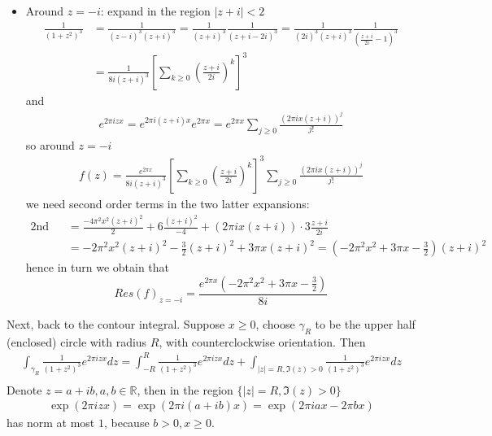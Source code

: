 \documentclass[11pt,a4paper]{article}
\begin{document}
\begin{itemize}
    \item Around $z=-i$: expand in the region $|z+i|<2$
    \begin{align*}
        \frac{1}{(1+z^2)^3} &= \frac{1}{(z-i)^3(z+i)^3} = \frac{1}{(z+i)^3}\frac{1}{(z+i-2i)^3} = \frac{1}{(2i)^3(z+i)^3}\frac{1}{(\frac{z+i}{2i}-1)^3} \\
        &=\frac{1}{8i(z+i)^3} \left[\sum_{k\ge0}  \left(\frac{z+i}{2i}\right)^k\right]^3
    \end{align*}
    and
    \begin{align*}
        e^{2\pi i zx} = e^{2\pi i (z+i)x} e^{2\pi x} = e^{2\pi x} \sum_{j\ge 0} \frac{(2\pi i x(z+i))^j}{j!}
    \end{align*}
    so around $z=-i$
    \begin{align*}
        f(z) = \frac{e^{2\pi x}}{8i(z+i)^3} \left[\sum_{k\ge0} \left(\frac{z+i}{2i}\right)^k\right]^3 \sum_{j\ge 0} \frac{(2\pi i x(z+i))^j}{j!}
    \end{align*}
    we need second order terms in the two latter expansions:
    \begin{align*}
        \text{2nd order terms} &= \frac{-4\pi^2x^2(z+i)^2}{2} + 6\frac{(z+i)^2}{-4} + (2\pi i x(z+i))\cdot 3\frac{z+i}{2i} \\
        &=-2\pi^2 x^2 (z+i)^2 - \frac{3}{2}(z+i)^2 +3\pi x(z+i)^2 = (-2\pi^2 x^2 + 3\pi x - \frac{3}{2})(z+i)^2
    \end{align*}
    hence in turn we obtain that
    \begin{equation*}
        Res(f)_{z=-i} = \frac{e^{2\pi x}(-2\pi^2 x^2 + 3\pi x - \frac{3}{2})}{8i}
    \end{equation*}
\end{itemize}

Next, back to the contour integral. Suppose $x\ge0$, choose $\gamma_R$ to be the upper half (enclosed) circle with radius $R$, with counterclockwise orientation. Then
\begin{align*}
    \int_{\gamma_R} \frac{1}{(1+z^2)^3} e^{2\pi i z x} dz = \int_{-R}^R \frac{1}{(1+z^2)^3}e^{2\pi i zx} dz + \int_{|z|=R, \Im(z)>0} \frac{1}{(1+z^2)^3}e^{2\pi i zx} dz \\
\end{align*}
Denote $z =a+ib, a, b\in\mathbb{R}$, then in the region $\{|z|=R, \Im(z)>0\}$
\begin{align*}
    \exp{(2\pi i zx)} = \exp{(2\pi i (a+ib)x)} = \exp{(2\pi i ax-2\pi bx)}
\end{align*}
has norm at most $1$, because $b>0, x\ge0$.
\end{document}

